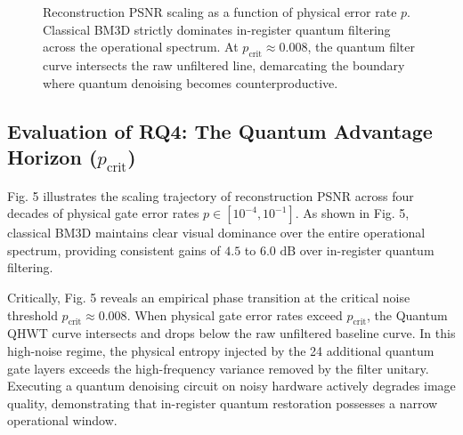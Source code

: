 \documentclass[12pt,onecolumn,draftclsnofoot]{IEEEtran}
\begin{document}
\begin{figure}[htbp]
{%
}
\caption{Reconstruction PSNR scaling as a function of physical error rate $p$. Classical BM3D strictly dominates in-register quantum filtering across the operational spectrum. At $p_{\text{crit}} \approx 0.008$, the quantum filter curve intersects the raw unfiltered line, demarcating the boundary where quantum denoising becomes counterproductive.}
\label{fig:noise_scaling}
\end{figure}

\subsection{Evaluation of RQ4: The Quantum Advantage Horizon ($p_{\text{crit}}$)}
Fig. 5 illustrates the scaling trajectory of reconstruction PSNR across four decades of physical gate error rates $p \in [10^{-4}, 10^{-1}]$. As shown in Fig. 5, classical BM3D maintains clear visual dominance over the entire operational spectrum, providing consistent gains of $4.5$ to $6.0\text{ dB}$ over in-register quantum filtering.

Critically, Fig. 5 reveals an empirical phase transition at the critical noise threshold $p_{\text{crit}} \approx 0.008$. When physical gate error rates exceed $p_{\text{crit}}$, the Quantum QHWT curve intersects and drops below the raw unfiltered baseline curve. In this high-noise regime, the physical entropy injected by the 24 additional quantum gate layers exceeds the high-frequency variance removed by the filter unitary. Executing a quantum denoising circuit on noisy hardware actively degrades image quality, demonstrating that in-register quantum restoration possesses a narrow operational window.
\end{document}
